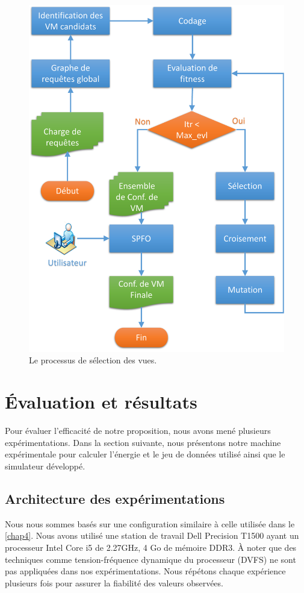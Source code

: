 \begin{figure}
	\centering
	\includegraphics[scale=0.5]{chapitre6/chap6Fig/mv-moea.pdf}
	\caption{Le processus de sélection des vues.}
	\label{fig:methodo}
\end{figure}

\section{Évaluation et résultats}\label{sec:Experiments}
Pour évaluer l'efficacité de notre proposition, nous avons mené plusieurs expérimentations. Dans la section suivante, nous présentons notre machine expérimentale pour calculer l'énergie et le jeu de données utilisé ainsi que le simulateur développé.

\subsection{Architecture des expérimentations}\label{subsec:ExperimentSetup}
Nous nous sommes basés sur une configuration similaire à celle utilisée dans le \ref{chap4}. Nous avons utilisé une station de travail Dell Precision T1500 ayant un processeur Intel Core i5 de 2.27GHz, 4 Go de mémoire DDR3. À noter que des techniques comme tension-fréquence dynamique du processeur (DVFS) ne sont pas appliquées dans nos expérimentations. Nous répétons chaque expérience plusieurs fois pour assurer la fiabilité des valeurs observées.

